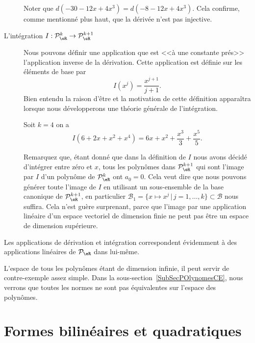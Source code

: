\begin{description}
\begin{example}
    Noter que $d(-30-12x+4x^3)=d(-8-12x+4x^3)$. Cela confirme, comme mentionné plus haut, que la dérivée n'est pas injective.
\end{example}
      \item[L'intégration $I: \mathcal{P}_\eR^k \to \mathcal{P}_\eR^{k+1}$] Nous pouvons définir une application que est <<à une constante prés>> l'application inverse de la dérivation. Cette application est définie sur les éléments de base par
          \begin{equation}
                I(x^j)= \frac{x^{j+1}}{j+1}.
          \end{equation}
          Bien entendu la raison d'être et la motivation de cette définition apparaîtra lorsque nous développerons une théorie générale de l'intégration.

\begin{example}
   Soit $k=4$ on a
  \begin{equation}
    I(6+2x+x^2+x^4)= 6x+x^2+\frac{x^3}{3}+\frac{x^5}{5}.
    \end{equation}
\end{example}

Remarquez que, étant donné que dans la définition de $I$ nous avons décidé d'intégrer entre zéro et $x$, tous les polynômes dans $\mathcal{P}_\eR^{k+1}$ qui sont l'image par $I$ d'un polynôme de $\mathcal{P}_\eR^{k}$ ont $a_0=0$. Cela veut dire que nous pouvons générer toute l'image de $I$ en utilisant un sous-ensemble de la base canonique de $\mathcal{P}_\eR^{k+1}$,  en particulier $\mathcal{B}_1=\{x\mapsto x^j \,|\, j=1, \ldots, k\}\subset \mathcal{B}$ nous suffira. Cela n'est guère surprenant, parce que l'image par une application linéaire d'un espace vectoriel de dimension finie ne peut pas être un espace de dimension supérieure.
\end{description}

Les applications de dérivation et intégration correspondent évidemment à des applications linéaires de $\mathcal{P}_\eR$ dans lui-même.

L'espace de tous les polynômes étant de dimension infinie, il peut servir de contre-exemple assez simple. Dans la sous-section~\ref{SubSecPOlynomesCE}, nous verrons que toutes les normes ne sont pas équivalentes sur l'espace des polynômes.

\section{Formes bilinéaires et quadratiques}
\label{SecTQkRXIu}

